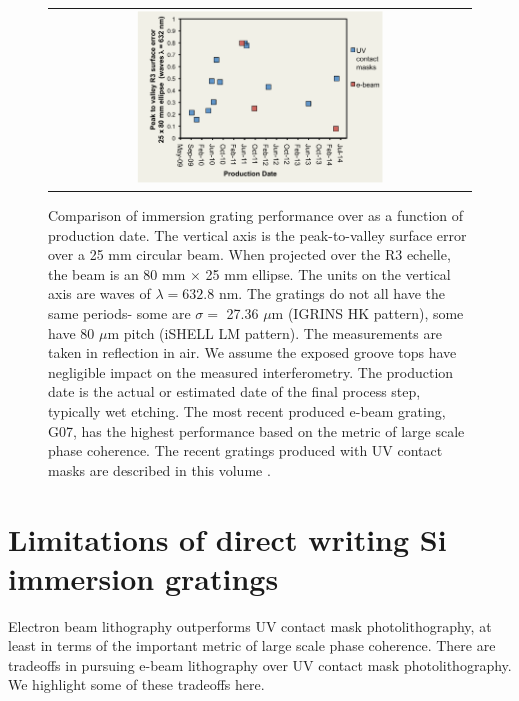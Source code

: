 \documentclass[]{spie}  %
\begin{document}
\begin{figure}
  \begin{center}
 \begin{tabular}{c}
    \includegraphics[width=0.6\textwidth]{figs/PV_time_paper_2014.pdf}
   \end{tabular}
  \end{center}
    \caption{Comparison of immersion grating performance over as a function of production date.  The vertical axis is the peak-to-valley surface error over a 25 mm circular beam.  When projected over the R3 echelle, the beam is an 80 mm $\times$ 25 mm ellipse.  The units on the vertical axis are waves of $\lambda = 632.8 $ nm.  The gratings do not all have the same periods- some are $\sigma = $ 27.36 $\mu$m (IGRINS HK pattern), some have 80 $\mu$m pitch (iSHELL LM pattern).  The measurements are taken in reflection in air.  We assume the exposed groove tops have negligible impact on the measured interferometry.  The production date is the actual or estimated date of the final process step, typically wet etching.  The most recent produced e-beam grating, G07, has the highest performance based on the metric of large scale phase coherence.  The recent gratings produced with UV contact masks are described in this volume \cite{2014SPIE.BROOKS.GRATINGS}.  }
  \label{fig:igrams}
\end{figure}


\section{Limitations of direct writing Si immersion gratings}
Electron beam lithography outperforms UV contact mask photolithography, at least in terms of the important metric of large scale phase coherence.  There are tradeoffs in pursuing e-beam lithography over UV contact mask photolithography.  We highlight some of these tradeoffs here.
\end{document}

